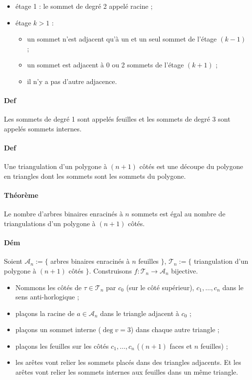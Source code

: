 \documentclass{article}
\newenvironment{lst}
	{\begin{minipage}[t]{.9\linewidth}\begin{itemize}}
	{\end{itemize}\end{minipage}}
\begin{document}
			\begin{itemize}
				\item étage 1 : le sommet de degré 2 appelé racine ;
				\item étage $k > 1$ :
					\begin{lst}
						\item un sommet n'est adjacent qu'à un et un seul sommet de l'étage $(k-1)$ ;
						\item un sommet est adjacent à 0 ou 2 sommets de l'étage $(k+1)$ ;
						\item il n'y a pas d'autre adjacence.
					\end{lst}
			\end{itemize}
			
			\paragraph{Def} Les sommets de degré 1 sont appelés feuilles et les sommets de degré 3 sont appelés sommets internes.

			\paragraph{Def} Une triangulation d'un polygone à $(n+1)$ côtés est une découpe du polygone en triangles dont les sommets sont les sommets du polygone.

			\paragraph{Théorème} Le nombre d'arbres binaires enracinés à $n$ sommets est égal au nombre de triangulations d'un polygone à $(n+1)$ côtés.

			\paragraph{Dém} Soient $\mathcal A_n := \{$ arbres binaires enracinés à $n$ feuilles $\}$, $\mathcal T_n := \{$ triangulation d'un polygone à $(n+1)$ côtés $\}$.
			Construisons $f : \mathcal T_n \to \mathcal A_n$ bijective.

			\begin{itemize}
				\item Nommons les côtés de $\tau \in \mathcal T_n$ par $c_0$ (sur le côté supérieur), $c_1, \ldots, c_n$ dans le sens anti-horlogique ;
				\item plaçons la racine de $a \in \mathcal A_n$ dans le triangle adjacent à $c_0$ ;
				\item plaçons un sommet interne ($\deg v = 3$) dans chaque autre triangle ;
				\item plaçons les feuilles sur les côtés $c_1, \ldots, c_n$ ($(n+1)$ faces et $n$ feuilles) ;
				\item les arêtes vont relier les sommets placés dans des triangles adjacents. Et les arêtes vont relier les sommets internes aux feuilles dans un même triangle.
			\end{itemize}
\end{document}
